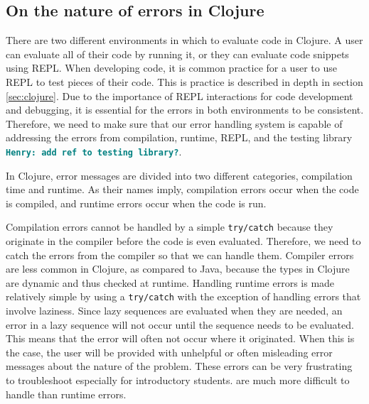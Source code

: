 \documentclass[12pt]{article}
\newcommand{\comment}[1]{{\bf \tt  {#1}}}
\newcommand{\emcomment}[1]{\textcolor{ForestGreen}{\comment{Elena: {#1}}}}
\newcommand{\hfcomment}[1]{\textcolor{Teal}{\comment{Henry: {#1}}}}
\begin{document}
\subsection{On the nature of errors in Clojure}


There are two different environments in which to evaluate code in Clojure. A user can 
evaluate all of their code by running it, or they can evaluate code snippets using REPL. 
When developing code, it is common practice for a user to use REPL to test pieces of 
their code. This is practice is described in depth in section \ref{sec:clojure}. Due to 
the importance of REPL interactions for code development and debugging, it is essential 
for the errors in both environments to be consistent. Therefore, we need to make sure 
that our error handling system is capable of addressing the errors from compilation, 
runtime,  REPL, and the testing library \hfcomment{add ref to testing library?}.

In Clojure, error messages are divided into two different categories, compilation time 
and runtime. As their names imply, compilation errors occur when the code is compiled, 
and runtime errors occur when the code is run.

Compilation errors cannot be handled by a simple {\tt try/catch} because they originate 
in the compiler before the code is even evaluated. Therefore, we need to catch the 
errors from the compiler so that we can handle them. Compiler errors are less common in 
Clojure, as compared to Java, because the types in Clojure are dynamic and thus checked 
at runtime.
Handling runtime errors is made relatively simple by using a {\tt try/catch}  with the 
exception of handling errors that involve laziness. Since lazy sequences are evaluated 
when they are needed, an error in a lazy sequence will not occur until the sequence 
needs to be evaluated. This means that the error will often not occur where it 
originated. When this is the case, the user will be provided with unhelpful or often 
misleading error messages about the nature of the problem. These errors can be very 
frustrating to troubleshoot especially for introductory students. %
are much more difficult to handle than runtime errors. 
\end{document}
